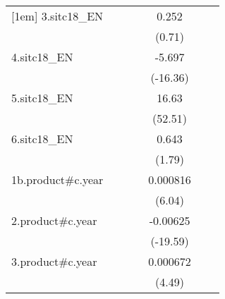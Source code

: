 {\begin{tabular}{l*{6}{c}}
[1em]
3.sitc18\_EN         &                     &                     &                     &       0.252         &                     &                     \\
                    &                     &                     &                     &      (0.71)         &                     &                     \\
[1em]
4.sitc18\_EN         &                     &                     &                     &      -5.697\sym{***}&                     &                     \\
                    &                     &                     &                     &    (-16.36)         &                     &                     \\
[1em]
5.sitc18\_EN         &                     &                     &                     &       16.63\sym{***}&                     &                     \\
                    &                     &                     &                     &     (52.51)         &                     &                     \\
[1em]
6.sitc18\_EN         &                     &                     &                     &       0.643         &                     &                     \\
                    &                     &                     &                     &      (1.79)         &                     &                     \\
[1em]
1b.product#c.year   &                     &                     &                     &    0.000816\sym{***}&                     &                     \\
                    &                     &                     &                     &      (6.04)         &                     &                     \\
[1em]
2.product#c.year    &                     &                     &                     &    -0.00625\sym{***}&                     &                     \\
                    &                     &                     &                     &    (-19.59)         &                     &                     \\
[1em]
3.product#c.year    &                     &                     &                     &    0.000672\sym{***}&                     &                     \\
                    &                     &                     &                     &      (4.49)         &                     &                     \\

\end{tabular}}
